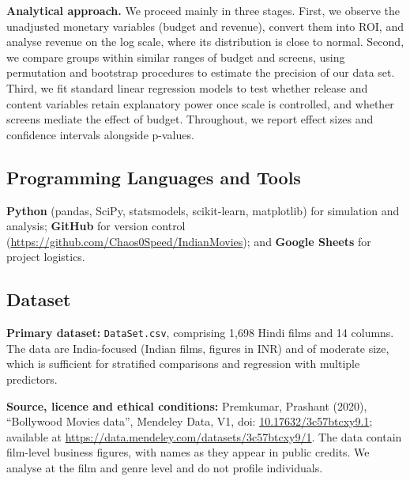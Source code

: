 \documentclass[11pt,a4paper]{article}
\newcommand{\tool}[1]{\textbf{#1}}
\begin{document}
\textbf{Analytical approach.}
We proceed mainly in three stages. First, we observe the unadjusted monetary variables (budget and revenue), convert them into ROI, and analyse revenue on the log scale, where its distribution is close to normal. 
Second, we compare groups within similar ranges of budget and screens, using permutation and bootstrap procedures to estimate the precision of our data set.
Third, we fit standard linear regression models to test whether release and content variables retain explanatory power once scale is controlled, and whether screens mediate the effect of budget. 
Throughout, we report effect sizes and confidence intervals alongside p-values.

\subsection{Programming Languages and Tools}
\tool{Python} (pandas, SciPy, statsmodels, scikit-learn, matplotlib) for simulation and analysis; \tool{GitHub} for version control (\url{https://github.com/Chaos0Speed/IndianMovies}); and \tool{Google Sheets} for project logistics.

\subsection{Dataset}
\textbf{Primary dataset:} \texttt{DataSet.csv}, comprising 1{,}698 Hindi films and 14 columns. The data are India-focused (Indian films, figures in INR) and of moderate size, which is sufficient for stratified comparisons and regression with multiple predictors.

\textbf{Source, licence and ethical conditions:} Premkumar, Prashant (2020), ``Bollywood Movies data'', Mendeley Data, V1, doi: \href{https://doi.org/10.17632/3c57btcxy9.1}{10.17632/3c57btcxy9.1}; available at \url{https://data.mendeley.com/datasets/3c57btcxy9/1}. The data contain film-level business figures, with names as they appear in public credits. We analyse at the film and genre level and do not profile individuals.
\end{document}
